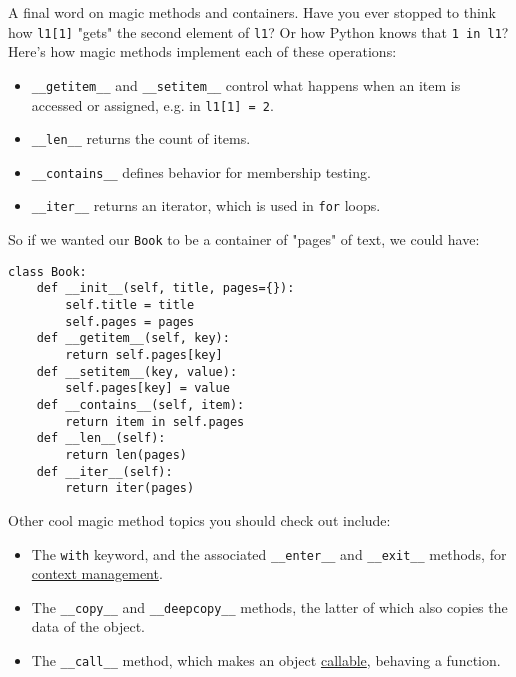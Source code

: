 A final word on magic methods and containers. Have you ever stopped to think how \lstinline{l1[1]} "gets" the second element of \lstinline{l1}? Or how Python knows that \lstinline{1 in l1}? Here's how magic methods implement each of these operations:

\begin{itemize}
	\item \lstinline{__getitem__} and \lstinline{__setitem__} control what happens when an item is accessed or assigned, e.g. in \lstinline{l1[1] = 2}.
	\item \lstinline{__len__} returns the count of items.
	\item \lstinline{__contains__} defines behavior for membership testing.
	\item \lstinline{__iter__} returns an iterator, which is used in \lstinline{for} loops.
\end{itemize}

So if we wanted our \lstinline{Book} to be a container of "pages" of text, we could have:

\begin{lstlisting}
class Book:
	def __init__(self, title, pages={}):
		self.title = title
		self.pages = pages
	def __getitem__(self, key):
		return self.pages[key]
	def __setitem__(key, value):
		self.pages[key] = value
	def __contains__(self, item):
		return item in self.pages
	def __len__(self):
		return len(pages)
	def __iter__(self):
		return iter(pages)
\end{lstlisting}

Other cool magic method topics you should check out include:
\begin{itemize}
	\item The \lstinline{with} keyword, and the associated \lstinline{__enter__} and 	\lstinline{__exit__} methods, for \href{https://alysivji.github.io/managing-resources-with-context-managers-pythonic.html}{context management}.
	\item The \lstinline{__copy__} and \lstinline{__deepcopy__} methods, the latter of which also copies the data of the object.
	\item The \lstinline{__call__} method, which makes an object \href{https://medium.com/swlh/callables-in-python-how-to-make-custom-instance-objects-callable-too-516d6eaf0c8d}{callable}, behaving a function.
\end{itemize}

